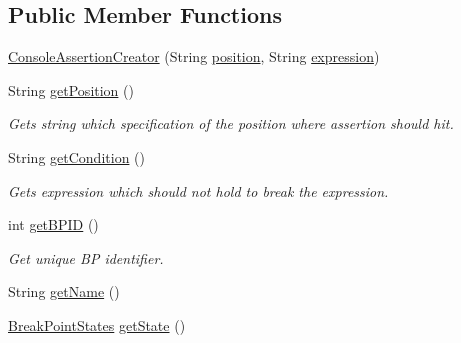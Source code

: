 \subsection*{Public Member Functions}
\begin{DoxyCompactItemize}
\item 
\hyperlink{classgov_1_1nasa_1_1jpf_1_1inspector_1_1client_1_1commands_1_1_cmd_assertions_breakpoint_1_1_console_assertion_creator_a49e36afb67758f99bf099838ba780db4}{Console\+Assertion\+Creator} (String \hyperlink{classgov_1_1nasa_1_1jpf_1_1inspector_1_1client_1_1commands_1_1_cmd_assertions_breakpoint_1_1_console_assertion_creator_a30a32733d7d06276c1370a058a598dd0}{position}, String \hyperlink{classgov_1_1nasa_1_1jpf_1_1inspector_1_1client_1_1commands_1_1_cmd_assertions_breakpoint_1_1_console_assertion_creator_a05aeb828189451e21f6022b446326e0c}{expression})
\item 
String \hyperlink{classgov_1_1nasa_1_1jpf_1_1inspector_1_1client_1_1commands_1_1_cmd_assertions_breakpoint_1_1_console_assertion_creator_af62263d7c059965ee74081f79cbee1dd}{get\+Position} ()
\begin{DoxyCompactList}\small\item\em Gets string which specification of the position where assertion should hit. \end{DoxyCompactList}\item 
String \hyperlink{classgov_1_1nasa_1_1jpf_1_1inspector_1_1client_1_1commands_1_1_cmd_assertions_breakpoint_1_1_console_assertion_creator_a2923430f0c433bb630772c1c149f432b}{get\+Condition} ()
\begin{DoxyCompactList}\small\item\em Gets expression which should not hold to break the expression. \end{DoxyCompactList}\item 
int \hyperlink{classgov_1_1nasa_1_1jpf_1_1inspector_1_1client_1_1commands_1_1_cmd_breakpoint_create_1_1_console_breakpoint_creation_expression_aabe1aec7aaebc064aa33ff0cb2e8d69c}{get\+B\+P\+ID} ()
\begin{DoxyCompactList}\small\item\em Get unique BP identifier. \end{DoxyCompactList}\item 
String \hyperlink{classgov_1_1nasa_1_1jpf_1_1inspector_1_1client_1_1commands_1_1_cmd_breakpoint_create_1_1_console_breakpoint_creation_expression_aea9526b3c8cdf0d785f137401ab8c4fb}{get\+Name} ()
\item 
\hyperlink{enumgov_1_1nasa_1_1jpf_1_1inspector_1_1interfaces_1_1_break_point_states}{Break\+Point\+States} \hyperlink{classgov_1_1nasa_1_1jpf_1_1inspector_1_1client_1_1commands_1_1_cmd_breakpoint_create_1_1_console_breakpoint_creation_expression_a1dba274145a2220c1f5d4a45848376b7}{get\+State} ()

\end{DoxyCompactItemize}

